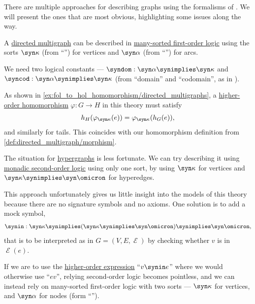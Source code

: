 \begin{remark}\label{rem:logical_theory_of_graphs}
  There are multiple approaches for describing graphs using the formalisms of . We will present the ones that are most obvious, highlighting some issues along the way.

  \begin{thmenum}
     A \hyperref[def:directed_multigraph]{directed multigraph} can be described in \hyperref[def:many_sorted_fol]{many-sorted first-order logic} using the sorts \( \syn\kappa \) (from \enquote{}) for vertices and \( \syn\alpha \) (from \enquote{}) for arcs.

    We need two logical constants --- \( \syndom: \syn\alpha \synimplies \syn\kappa \) and \( \syncod: \syn\alpha \synimplies \syn\kappa \) (from \enquote{domain} and \enquote{codomain}, as in ).

    As shown in \cref{ex:fol_to_hol_homomorphism/directed_multigraphs}, a \hyperref[def:hol_homomorphism]{higher-order homomorphism} \( \varphi: G \to H \) in this theory must satisfy
    \begin{equation*}
      h_H(\varphi_{\syn\kappa}(e)) = \varphi_{\syn\kappa}(h_G(e)),
    \end{equation*}
    and similarly for tails. This coincides with our homomorphism definition from \cref{def:directed_multigraph/morphism}.

     The situation for \hyperref[def:hypergraph]{hypergraphs} is less fortunate. We can try describing it using \hyperref[def:second_order_logic]{monadic second-order logic} using only one sort, by using \( \syn\kappa \) for vertices and \( \syn\kappa \synimplies \syn\omicron \) for hyperedges.

    This approach unfortunately gives us little insight into the models of this theory because there are no signature symbols and no axioms. One solution is to add a mock symbol,
    \begin{equation*}
      \synin: \syn\kappa \synimplies (\syn\kappa \synimplies \syn\omicron) \synimplies \syn\omicron,
    \end{equation*}
    that is to be interpreted as in \( G = (V, E, \mscrE) \) by checking whether \( v \) is in \( \mscrE(e) \).

    If we are to use the \hyperref[def:hol_expression]{higher-order expression} \enquote{\( v \synin e \)} where we would otherwise use \enquote{\( ev \)}, relying second-order logic becomes pointless, and we can instead rely on many-sorted first-order logic with two sorts --- \( \syn\kappa \) for vertices, and \( \syn\alpha \) for nodes (form \enquote{}).


\end{thmenum}
\end{remark}
